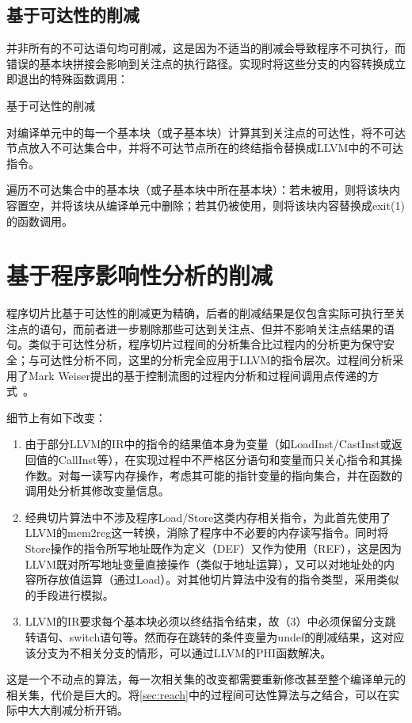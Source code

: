 \subsection{基于可达性的削减}
\label{subsec:reach-prune}

并非所有的不可达语句均可削减，这是因为不适当的削减会导致程序不可执行，而错误的基本块拼接会影响到关注点的执行路径。实现时将这些分支的内容转换成立即退出的特殊函数调用：
\begin{algorithm}\label{alg:reach-prune}
\caption{基于可达性的削减}
\SetAlgoNoLine
对编译单元中的每一个基本块（或子基本块）计算其到关注点的可达性，将不可达节点放入不可达集合中，并将不可达节点所在的终结指令替换成LLVM中的不可达指令。

遍历不可达集合中的基本块（或子基本块中所在基本块）：若未被用，则将该块内容置空，并将该块从编译单元中删除；若其仍被使用，则将该块内容替换成exit(1)的函数调用。
\end{algorithm}


\section{基于程序影响性分析的削减}
\label{sec:slicing}

程序切片比基于可达性的削减更为精确，后者的削减结果是仅包含实际可执行至关注点的语句，而前者进一步剔除那些可达到关注点、但并不影响关注点结果的语句。类似于可达性分析，程序切片过程间的分析集合比过程内的分析更为保守安全；与可达性分析不同，这里的分析完全应用于LLVM的指令层次。过程间分析采用了Mark Weiser提出的基于控制流图的过程内分析和过程间调用点传递的方式~。

细节上有如下改变：
\begin{enumerate}
\item 由于部分LLVM的IR中的指令的结果值本身为变量（如LoadInst/CastInst或返回值的CallInst等），在实现过程中不严格区分语句和变量而只关心指令和其操作数。对每一读写内存操作，考虑其可能的指针变量的指向集合，并在函数的调用处分析其修改变量信息。
\item 经典切片算法中不涉及程序Load/Store这类内存相关指令，为此首先使用了LLVM的mem2reg这一转换，消除了程序中不必要的内存读写指令。同时将Store操作的指令所写地址既作为定义（DEF）又作为使用（REF），这是因为LLVM既对所写地址变量直接操作（类似于地址运算），又可以对地址处的内容所存放值运算（通过Load）。对其他切片算法中没有的指令类型，采用类似的手段进行模拟。
\item LLVM的IR要求每个基本块必须以终结指令结束，故（3）中必须保留分支跳转语句、switch语句等。然而存在跳转的条件变量为undef的削减结果，这对应该分支为不相关分支的情形，可以通过LLVM的PHI函数解决。
\end{enumerate}
这是一个不动点的算法，每一次相关集的改变都需要重新修改甚至整个编译单元的相关集，代价是巨大的。将\autoref{sec:reach}中的过程间可达性算法与之结合，可以在实际中大大削减分析开销。

